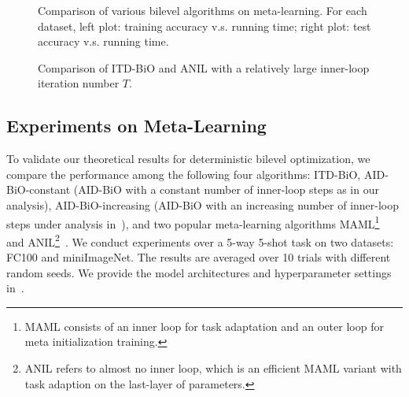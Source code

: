 \documentclass{osudissert96}
\begin{document}
 \begin{figure*}[ht]
  \vspace{-2mm}
	\centering    
	\vspace{-0.2cm}
	\caption{Comparison of various bilevel algorithms on meta-learning. For each dataset, left plot: training accuracy v.s. running time; right plot: test accuracy v.s. running time.}\label{fig:strfc100bievlcsaa}
	  \vspace{-0.2cm}
\end{figure*}

  \begin{figure*}[ht]
  \vspace{-2mm}
	\centering    
	\vspace{-0.2cm}
	\caption{Comparison of ITD-BiO and ANIL with a relatively large inner-loop iteration number $T$.}\label{figure:resultlg}
	  \vspace{-0.2cm}
\end{figure*}

\subsection*{Experiments on Meta-Learning}
 To validate our theoretical results for deterministic bilevel optimization, we compare the performance among the following four algorithms: ITD-BiO, AID-BiO-constant (AID-BiO with a constant number of inner-loop steps as in our analysis), AID-BiO-increasing (AID-BiO with an increasing number of inner-loop steps under analysis in~\cite{ghadimi2018approximation}), and two popular meta-learning algorithms MAML\footnote{MAML consists of an inner loop for task  adaptation and an outer loop for meta initialization training.}~\cite{finn2017model} and ANIL\footnote{ANIL refers to almost no inner loop, which is an efficient MAML variant with task adaption on the last-layer of parameters.}~\cite{raghu2019rapid}. We conduct experiments over a 5-way 5-shot task on two datasets: FC100 and miniImageNet. The results are averaged over 10 trials with different random seeds. We provide the model architectures and hyperparameter settings in~.
\end{document}
